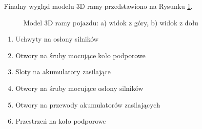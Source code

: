 Finalny wygląd modelu 3D ramy przedstawiono na Rysunku \ref*{fig:model3drama}.

\begin{figure}[!h]
    \centering
    \qquad
    \caption{Model 3D ramy pojazdu: a) widok z góry, b) widok z dołu}
    \label{fig:model3drama}
\end{figure}

\begin{enumerate}
    \item Uchwyty na osłony silników
    \item Otwory na śruby mocujące koło podporowe
    \item Sloty na akumulatory zasilające
    \item Otwory na śruby mocujące osłony silników
    \item Otwory na przewody akumulatorów zasilających
    \item Przestrzeń na koło podporowe
\end{enumerate}

